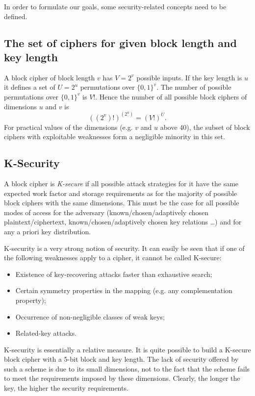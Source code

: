 \documentclass{llncs}
\begin{document}
In order to formulate our goals, some security-related concepts
need to be defined.

\subsection{The set of ciphers for given block length and key
length}

A block cipher of block length $v$ has $V = 2^v$ possible inputs.
If the key length is $u$ it defines a set of $U = 2^u$
permutations over $\{0,1\}^v$. The number of possible
permutations over $\{0,1\}^v$ is $V!$. Hence the number of all
possible block ciphers of dimensions $u$ and $v$ is
\[
((2^v)!)^{(2^u)} = (V!)^U.
\]
For practical values of the dimensions (e.g. $v$ and $u$ above
40), the subset of block ciphers with exploitable weaknesses form
a negligible minority in this set.

\subsection{K-Security}

\begin{definition}
A block cipher is \emph{K-secure} if all possible attack
strategies for it have the same expected work factor and storage
requirements as for the majority of possible block ciphers with
the same dimensions. This must be the case for all possible modes
of access for the adversary (known/chosen/adaptively chosen
plaintext/ciphertext, known/chosen/adaptively chosen key
relations \dots) and for any a priori key distribution.
\end{definition}
K-security is a very strong notion of security. It can easily be
seen that if one of the following weaknesses apply to a cipher,
it cannot be called K-secure:
\begin{itemize}
\item Existence of key-recovering attacks faster than exhaustive
search;
\item Certain symmetry properties in the mapping (e.g.
any complementation property);
\item Occurrence of non-negligible classes of weak keys;
\item Related-key attacks.
\end{itemize}
K-security is essentially a relative measure. It is quite
possible to build a K-secure block cipher with a 5-bit block and
key length. The lack of security offered by such a scheme is due
to its small dimensions, not to the fact that the scheme fails to
meet the requirements imposed by these dimensions. Clearly, the
longer the key, the higher the security requirements.
\end{document}
